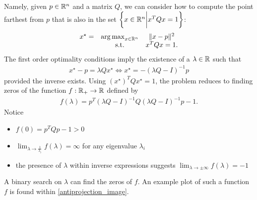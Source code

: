 Namely, given 
$p \in \mathbb R^n$ and a matrix $Q$,
we can consider how to compute  the point farthest from $p$ that is also in the set $\left\{x \in \mathbb R^n \bigg | x^TQx = 1 \right\}$:
\begin{align}
\begin{array}{ccc}
x^{\star} = &\operatorname*{arg\,max}_{x \in \mathbb R^n} & \|x - p\|^2 \\
& \textrm{s.t.} & x^TQx = 1.
\end{array} \label{antiprojection_problem}
\end{align}
The first order optimality conditions imply the existence of a $\lambda \in \mathbb R$ such that
\begin{align*}
x^{\star} - p = \lambda Qx^{\star} %
\Longleftrightarrow x^{\star} = -\left(\lambda Q - I\right)^{-1}p
\end{align*}
provided the inverse exists.
Using $\left(x^{\star}\right)^TQx^{\star} = 1$, the problem reduces to finding zeros of the function $f : \mathbb R_+ \to \mathbb R$ defined by
\begin{align*}
f(\lambda) = p^T\left(\lambda Q - I\right)^{-1}Q\left(\lambda Q - I\right)^{-1}p - 1.
\end{align*}
Notice 
\begin{itemize}
\item $f(0) = p^TQp - 1 > 0$
\item $\lim_{\lambda \to \frac 1 {\lambda_i}} f(\lambda) = \infty$ for any eigenvalue $\lambda_i$
\item the presence of $\lambda$ within inverse expressions suggests $\lim_{\lambda \to \pm \infty}f(\lambda) = -1$
\end{itemize}
A binary search on $\lambda$ can find the zeros of $f$.
An example plot of such a function $f$ is found within \cref{antiprojection_image}.


